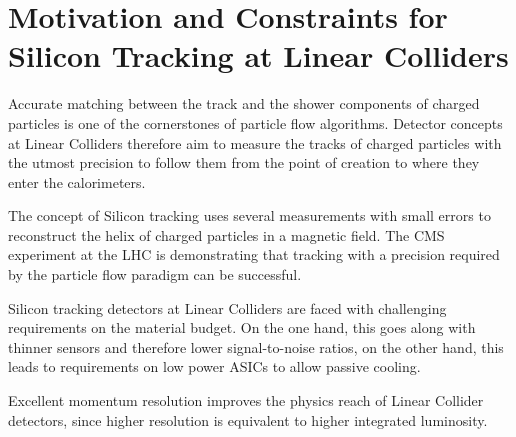 \section{Motivation and Constraints for Silicon Tracking at Linear Colliders}

Accurate matching between the track and the shower components of charged particles is one of the cornerstones of particle flow algorithms. Detector concepts at Linear Colliders therefore aim to measure the tracks of charged particles with the utmost precision to follow them from the point of creation to where they enter the calorimeters.

The concept of Silicon tracking uses several measurements with small errors to reconstruct the helix of charged particles in a magnetic field. The CMS experiment at the LHC is demonstrating that tracking with a precision required by the particle flow paradigm can be successful.

Silicon tracking detectors at Linear Colliders are faced with challenging requirements on the material budget. On the one hand, this goes along with thinner sensors and therefore lower signal-to-noise ratios, on the other hand, this leads to requirements on low power ASICs to allow passive cooling.

Excellent momentum resolution improves the physics reach of Linear Collider detectors, since higher resolution is equivalent to higher integrated luminosity.
